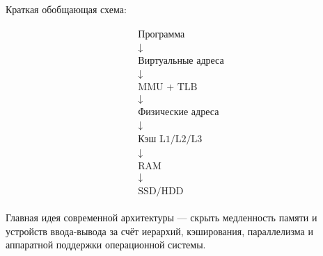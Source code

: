 \documentclass[12pt,a4paper]{article}
\theoremstyle{remark}
\begin{document}
Краткая обобщающая схема:

\[
\begin{array}{c}
\boxed{
\begin{array}{c}
\text{Программа} \\
\downarrow \\
\text{Виртуальные адреса} \\
\downarrow \\
\text{MMU + TLB} \\
\downarrow \\
\text{Физические адреса} \\
\downarrow \\
\text{Кэш L1/L2/L3} \\
\downarrow \\
\text{RAM} \\
\downarrow \\
\text{SSD/HDD}
\end{array}}
\end{array}
\]

Главная идея современной архитектуры --- скрыть медленность памяти и устройств ввода-вывода за счёт иерархий, кэширования, параллелизма и аппаратной поддержки операционной системы.
\end{document}
